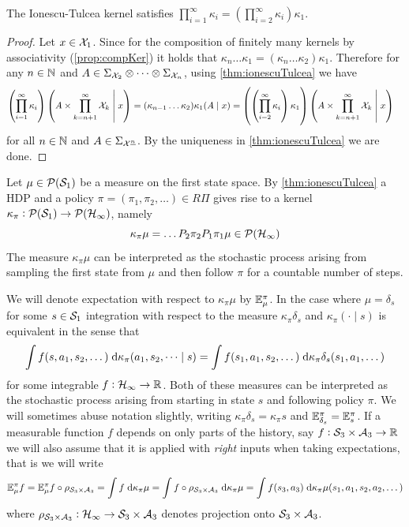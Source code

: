 \begin{lem}
  The Ionescu-Tulcea kernel satisfies
  $\prod_{i=1}^\infty \kappa_i = (\prod_{i=2}^\infty \kappa_i) \kappa_1$.
  \label{lem:ionescu}
\end{lem}
\begin{proof}
  Let $x \in \mathcal{X}_1$.
  Since for the composition of finitely many
  kernels by associativity (\cref{prop:compKer}) it holds that
  $\kappa_n \dots \kappa_1
  = (\kappa_n \dots \kappa_2) \kappa_1$.
  Therefore for any $n \in \mathbb{N}$ and $A \in \Sigma_{\mathcal{X}_2} \otimes
  \dots \otimes \Sigma_{\mathcal{X}_n}$, using \cref{thm:ionescuTulcea} we have
  \begin{align*}
    \left( \prod_{i=1}^\infty \kappa_i \right)
    \left( A \times \prod_{k=n+1}^\infty \mathcal{X}_k \;\middle\vert\; x \right)
    = (\kappa_{n-1} \dots \kappa_2) \kappa_1 (A \mid x)
    &= \left( \left( \prod_{i=2}^\infty \kappa_i \right) \kappa_1 \right)
    \left( A \times \prod_{k=n+1}^\infty \mathcal{X}_k \;\middle\vert\; x \right)
  \end{align*}
  for all $n \in \mathbb{N}$ and $A \in \Sigma_{\mathcal{X}^{\underline{n}}}$.
  By the uniqueness in \cref{thm:ionescuTulcea} we are done.
\end{proof}

Let $\mu \in \mathcal{P}(\mathcal{S}_1)$ be a measure on the first state space.
By \cref{thm:ionescuTulcea} a HDP and a policy
$\pi = (\pi_1, \pi_2, \dots) \in R\Pi$ gives rise to
a kernel $\kappa_\pi : \mathcal{P}(\mathcal{S}_1) \to \mathcal{P}(\mathcal{H}_\infty)$, namely
\begin{equation}
  \kappa_\pi \mu = \dots P_2 \pi_2 P_1 \pi_1 \mu \in \mathcal{P}(\mathcal{H}_\infty)
  \label{eq:kappaPi}
\end{equation}
The measure $\kappa_\pi \mu$ can be interpreted as the stochastic process
arising from sampling the first state from $\mu$ and then follow $\pi$
for a countable number of steps.
\begin{rem}
We will denote expectation with respect to $\kappa_\pi \mu$ by
$\mathbb{E}_{\mu}^\pi$. 
In the case where $\mu = \delta_{s}$ for some $s \in \mathcal{S}_1$
integration with respect to the measure $\kappa_\pi \delta_s$
and $\kappa_\pi(\cdot \mid s)$ is equivalent in the sense that
\[ \int f(s, a_1, s_2, \dots) \; \mathrm{d} \kappa_\pi(a_1, s_2, \dots \mid s)
= \int f(s_1, a_1, s_2, \dots) \; \mathrm{d} \kappa_\pi \delta_s(s_1, a_1, \dots) \]
for some integrable $f : \mathcal{H}_\infty \to \mathbb{R}$.
Both of these measures can be interpreted as the stochastic process
arising from starting in state $s$ and following policy $\pi$.
We will sometimes abuse notation slightly, writing
$\kappa_\pi \delta_s = \kappa_\pi s$ and $\mathbb{E}_{\delta_s}^\pi = \mathbb{E}_s^\pi$.
If a measurable function $f$ depends on only parts of the history,
say $f: \mathcal{S}_3 \times \mathcal{A}_3 \to \mathbb{R}$ we will also assume that
it is applied with \emph{right} inputs when taking expectations, that is
we will write
\[ \mathbb{E}^\pi_\mu f = \mathbb{E}^\pi_\mu f \circ \rho_{\mathcal{S}_3 \times \mathcal{A}_3} =
\int f \; \mathrm{d} \kappa_\pi \mu = \int f \circ \rho_{\mathcal{S}_3 \times \mathcal{A}_3}
\; \mathrm{d} \kappa_\pi \mu =
\int f(s_3, a_3) \; \mathrm{d} \kappa_\pi \mu (s_1, a_1, s_2, a_2, \dots) \]
where $\rho_{\mathcal{S}_3 \times \mathcal{A}_3} :
\mathcal{H}_\infty \to \mathcal{S}_3 \times \mathcal{A}_3$ denotes projection 
onto $\mathcal{S}_3 \times \mathcal{A}_3$.
\label{rem:kerIntNot}
\end{rem}

